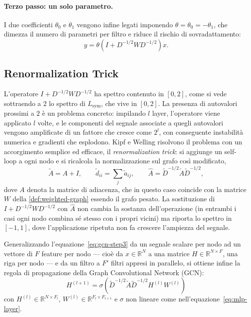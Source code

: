 \paragraph{Terzo passo: un solo parametro.} I due coefficienti $\theta_0$ e $\theta_1$ vengono infine legati imponendo $\theta = \theta_0 = -\theta_1$, che dimezza il numero di parametri per filtro e riduce il rischio di sovradattamento:
\begin{equation}
\label{eq:gcn-step3}
y = \theta\left(I + D^{-1/2}WD^{-1/2}\right)x .
\end{equation}

\subsection{Renormalization Trick}

L'operatore $I + D^{-1/2}WD^{-1/2}$ ha spettro contenuto in $[0,2]$, come si vede sottraendo a $2$ lo spettro di $L_{\mathrm{sym}}$, che vive in $[0,2]$. La presenza di autovalori prossimi a $2$ è un problema concreto: impilando $l$ layer, l'operatore viene applicato $l$ volte, e le componenti del segnale associate a quegli autovalori vengono amplificate di un fattore che cresce come $2^l$, con conseguente instabilità numerica e gradienti che esplodono. Kipf e Welling risolvono il problema con un accorgimento semplice ed efficace, il \emph{renormalization trick}: si aggiunge un self-loop a ogni nodo e si ricalcola la normalizzazione sul grafo così modificato,
\begin{equation}
\label{eq:renormalization}
\tilde A = A + I,\qquad \tilde d_{ii}=\sum_j\tilde a_{ij},\qquad \hat A = \tilde D^{-1/2}\tilde A\tilde D^{-1/2},
\end{equation}
dove $A$ denota la matrice di adiacenza, che in questo caso coincide con la matrice $W$ della \cref{def:weighted-graph} essendo il grafo pesato. La sostituzione di $I + D^{-1/2}WD^{-1/2}$ con $\hat A$ non cambia la sostanza dell'operazione (in entrambi i casi ogni nodo combina sé stesso con i propri vicini) ma riporta lo spettro in $[-1,1]$, dove l'applicazione ripetuta non fa crescere l'ampiezza del segnale.

Generalizzando l'equazione~\eqref{eq:gcn-step3} da un segnale scalare per nodo ad un vettore di $F$ feature per nodo — cioè da $x\in\mathbb{R}^N$ a una matrice $H\in\mathbb{R}^{N\times F}$, una riga per nodo — e da un filtro a $F'$ filtri appresi in parallelo, si ottiene infine la regola di propagazione della Graph Convolutional Network (GCN):
\begin{equation}
\label{eq:gcn}
\boxed{\;H^{(l+1)} = \sigma\!\left(\tilde D^{-1/2}\tilde A\tilde D^{-1/2}H^{(l)}W^{(l)}\right)\;}
\end{equation}
con $H^{(l)}\in\mathbb{R}^{N\times F_l}$, $W^{(l)}\in\mathbb{R}^{F_l\times F_{l+1}}$ e $\sigma$ non lineare come nell'equazione~\eqref{eq:mlp-layer}.

